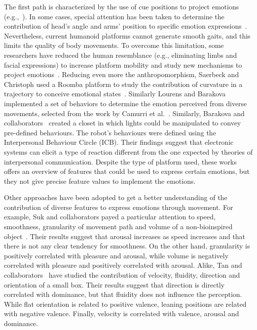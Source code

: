 The first path is characterized by the use of cue positions to project emotions (e.g.,~\cite{NAO2013}). In some cases, special attention has been taken to determine the contribution of head's angle and arms' position to specific emotion expressions~\cite{Brown2014}. 
Nevertheless, current humanoid platforms cannot generate smooth gaits, and this limits the quality of body movements. To overcome this limitation, some researchers have reduced the human resemblance (e.g., eliminating limbs and facial expressions) to increase platform mobility and study new mechanisms to project emotions~\cite{Arras2012}. Reducing even more the anthropomorphism, Saerbeck and Christoph used a Roomba platform to study the contribution of curvature in a trajectory to conceive emotional states~\cite{Saerbeck2010}. Similarly Lourens and Barakova~\cite{BarakovaL10} implemented a set of behaviors to determine the emotion perceived from diverse movements, selected from the work by Camurri et al.~\cite{pop00002}. Similarly, Barakova and collaborators~\cite{Barakova2013} created a closet in which lights could be manipulated to convey pre-defined behaviours. The robot's behaviours were defined using the Interpersonal Behaviour Circle (ICB). Their findings suggest that electronic systems can elicit a type of reaction different from the one expected by theories of interpersonal communication. Despite the type of platform used, these works offers an overview of features that could be used to express certain emotions, but they not give precise feature values to implement the emotions.

Other approaches have been adopted to get a better understanding of the contribution of diverse features to express emotions through movement. For example, Suk and collaborators payed a particular attention to speed, smoothness, granularity of movement path and volume of a non-bioinspired object~\cite{NAM2014}. Their results suggest that arousal increases as speed increases and that there is not any clear tendency for smoothness. On the other hand, granularity is positively correlated with pleasure and arousal, while volume is negatively correlated with pleasure and positively correlated with arousal. Alike, Tan and collaborators~\cite{Tan2016} have studied the contribution of velocity, fluidity, direction and orientation of a small box. Their results suggest that direction is directly correlated with dominance, but that fluidity does not influence the perception. While flat orientation is related to positive valence, leaning positions are related with negative valence. Finally, velocity is correlated with valence, arousal and dominance.  

